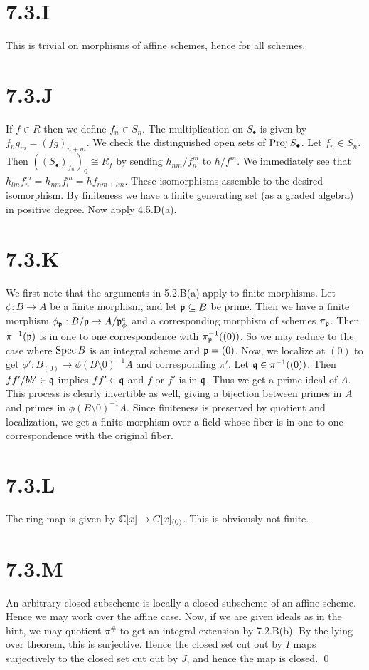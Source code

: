 \documentclass{article}
\begin{document}
\section{7.3.I}
This is trivial on morphisms of affine schemes, hence for all schemes.

\section{7.3.J}
If $f \in R$ then we define $f_n \in S_n$. The
multiplication on $S_{\bullet}$ is given by $f_ng_m=(fg)_{n+m}$.
We check the distinguished open sets of $\operatorname{Proj}
    S_{\bullet}$. Let
$f_n \in S_n$. Then $((S_{\bullet})_{f_n})_0
    \cong R_f$ by sending
$h_{nm}/f_n^m$ to $h/f^m$. We immediately see that
$h_{lm}f_n^m=h_{nm}f_l^m=hf_{nm+lm}$. These isomorphisms assemble to the desired
isomorphism. By finiteness we have a finite generating set (as a graded
algebra) in positive degree. Now apply 4.5.D(a).

\section{7.3.K}
We first note that the arguments in 5.2.B(a) apply to finite morphisms. Let
$\phi: B \to A$ be a finite morphism, and let $\mathfrak{p} \subseteq B$
be prime. Then we have a finite morphism $\phi_{\mathfrak{p}}: B/\mathfrak{p} \to A/\mathfrak{p}^{\text{e}}_\phi$ and a
corresponding morphism of schemes $\pi_{\mathfrak{p}}$. Then
$\pi^{-1}(\mathfrak{p})$ is in one to one correspondence with
$\pi_{\mathfrak{p}}^{-1}((0))$. So we may reduce to the case where
$\operatorname{Spec} B$ is an integral scheme and $\mathfrak{p}=(0)$. Now,
we localize at $(0)$ to get $\phi': B_{(0)} \to \phi(B\setminus 0)^{-1}A$ and
corresponding $\pi'$. Let $\mathfrak{q} \in \pi^{-1}((0))$. Then
$ff'/bb' \in \mathfrak{q}$ implies $ff' \in \mathfrak{q}$ and
$f$ or $f'$ is in
$\mathfrak{q}$. Thus we get a prime ideal of $A$.
This process is clearly invertible as well, giving a bijection between primes
in $A$ and primes in $\phi(B\setminus 0)^{-1}A$. Since
finiteness is preserved by quotient and localization, we get a finite morphism
over a field whose fiber is in one to one correspondence with the original
fiber.

\section{7.3.L}
The ring map is given by $\mathbb{C}[x] \to C[x]_{(0)}$. This is obviously not finite.

\section{7.3.M}
An arbitrary closed subscheme is locally a closed subscheme of an affine
scheme. Hence we may work over the affine case. Now, if we are given ideals as
in the hint, we may quotient $\pi^{\#}$ to get an integral
extension by 7.2.B(b). By the lying over theorem, this is surjective. Hence the
closed set cut out by $I$ maps surjectively to the closed
set cut out by $J$, and hence the map is closed. \qed
\end{document}
